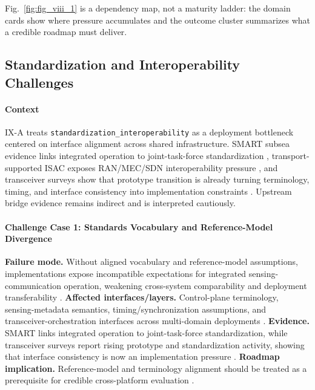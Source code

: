 \documentclass[letterpaper,journal]{IEEEtran}
\begin{document}
Fig.~\ref{fig:fig_viii_1} is a dependency map, not a maturity ladder: the domain cards show where pressure accumulates and the outcome cluster summarizes what a credible roadmap must deliver.

\subsection{Standardization and Interoperability Challenges}

\paragraph{Context}
IX-A treats \texttt{standardization\_interoperability} as a deployment bottleneck centered on interface alignment across shared infrastructure. SMART subsea evidence links integrated operation to joint-task-force standardization \cite{O_ISAC_220}, transport-supported ISAC exposes RAN/MEC/SDN interoperability pressure \cite{O_ISAC_025}, and transceiver surveys show that prototype transition is already turning terminology, timing, and interface consistency into implementation constraints \cite{O_ISAC_161}. Upstream bridge evidence remains indirect and is interpreted cautiously.

\paragraph{Challenge Case 1: Standards Vocabulary and Reference-Model Divergence}
\textbf{Failure mode.} Without aligned vocabulary and reference-model assumptions, implementations expose incompatible expectations for integrated sensing-communication operation, weakening cross-system comparability and deployment transferability \cite{O_ISAC_220, O_ISAC_161}. \textbf{Affected interfaces/layers.} Control-plane terminology, sensing-metadata semantics, timing/synchronization assumptions, and transceiver-orchestration interfaces across multi-domain deployments \cite{O_ISAC_220, O_ISAC_161}. \textbf{Evidence.} SMART links integrated operation to joint-task-force standardization, while transceiver surveys report rising prototype and standardization activity, showing that interface consistency is now an implementation pressure \cite{O_ISAC_220, O_ISAC_161}. \textbf{Roadmap implication.} Reference-model and terminology alignment should be treated as a prerequisite for credible cross-platform evaluation \cite{O_ISAC_220, O_ISAC_161}.
\end{document}
